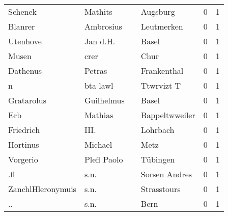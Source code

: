 \begin{tabular}{llllrr}
                  Schenek &                            Mathits &             &                                    Augsburg &          0 &         1 \\
                  Blanrer &                          Ambrosius &             &                                  Leutmerken &          0 &         1 \\
                 Utenhove &                           Jan d.H. &             &                                       Basel &          0 &         1 \\
                    Musen &                               crer &             &                                        Chur &          0 &         1 \\
                 Dathenus &                             Petras &             &                                 Frankenthal &          0 &         1 \\
                        n &                           bta lawl &             &                                  Ttwrvizt T &          0 &         1 \\
               Gratarolus &                         Guilhelmus &             &                                       Basel &          0 &         1 \\
                      Erb &                            Mathias &             &                              Bappeltwweiler &          0 &         1 \\
                Friedrich &                               III. &             &                                    Lohrbach &          0 &         1 \\
                 Hortinus &                            Michael &             &                                        Metz &          0 &         1 \\
                 Vorgerio &                        Plefl Paolo &             &                                    Tübingen &          0 &         1 \\
                      .fl &                               s.n. &             &                               Sorsen Andres &          0 &         1 \\
        ZanchlHleronymuis &                               s.n. &             &                                 Strasstours &          0 &         1 \\
                       .. &                               s.n. &             &                                        Bern &          0 &         1 \\

\end{tabular}
